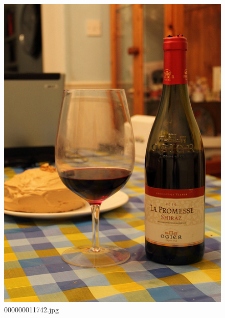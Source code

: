     \begin{figure}[h]
        \centering
        \includegraphics[width=0.8\linewidth]{../image set/easy/000000011742.jpg}
        \caption{000000011742.jpg}
    \end{figure}
